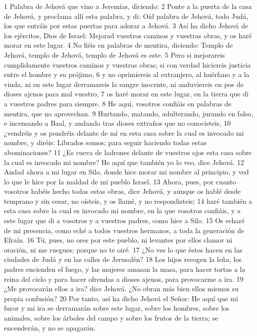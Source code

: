 1 Palabra de Jehová que vino a Jeremías, diciendo:
2 Ponte a la puerta de la casa de Jehová, y proclama allí esta palabra, y di: Oíd palabra de Jehová, todo Judá, los que entráis por estas puertas para adorar a Jehová.
3 Así ha dicho Jehová de los ejércitos, Dios de Israel: Mejorad vuestros caminos y vuestras obras, y os haré morar en este lugar.
4 No fiéis en palabras de mentira, diciendo: Templo de Jehová, templo de Jehová, templo de Jehová es este.
5 Pero si mejorareis cumplidamente vuestros caminos y vuestras obras; si con verdad hiciereis justicia entre el hombre y su prójimo,
6 y no oprimiereis al extranjero, al huérfano y a la viuda, ni en este lugar derramareis la sangre inocente, ni anduviereis en pos de dioses ajenos para mal vuestro,
7 os haré morar en este lugar, en la tierra que di a vuestros padres para siempre. 
8 He aquí, vosotros confiáis en palabras de mentira, que no aprovechan.
9 Hurtando, matando, adulterando, jurando en falso, e incensando a Baal, y andando tras dioses extraños que no conocisteis,
10 ¿vendréis y os pondréis delante de mí en esta casa sobre la cual es invocado mi nombre, y diréis: Librados somos; para seguir haciendo todas estas abominaciones?
11 ¿Es cueva de ladrones delante de vuestros ojos esta casa sobre la cual es invocado mi nombre? He aquí que también yo lo veo, dice Jehová.
12 Andad ahora a mi lugar en Silo, donde hice morar mi nombre al principio, y ved lo que le hice por la maldad de mi pueblo Israel.
13 Ahora, pues, por cuanto vosotros habéis hecho todas estas obras, dice Jehová, y aunque os hablé desde temprano y sin cesar, no oísteis, y os llamé, y no respondisteis;
14 haré también a esta casa sobre la cual es invocado mi nombre, en la que vosotros confiáis, y a este lugar que di a vosotros y a vuestros padres, como hice a Silo. 
15 Os echaré de mi presencia, como eché a todos vuestros hermanos, a toda la generación de Efraín.
16 Tú, pues, no ores por este pueblo, ni levantes por ellos clamor ni oración, ni me ruegues; porque no te oiré.
17 ¿No ves lo que éstos hacen en las ciudades de Judá y en las calles de Jerusalén?
18 Los hijos recogen la leña, los padres encienden el fuego, y las mujeres amasan la masa, para hacer tortas a la reina del cielo y para hacer ofrendas a dioses ajenos, para provocarme a ira.
19 ¿Me provocarán ellos a ira? dice Jehová. ¿No obran más bien ellos mismos su propia confusión?
20 Por tanto, así ha dicho Jehová el Señor: He aquí que mi furor y mi ira se derramarán sobre este lugar, sobre los hombres, sobre los animales, sobre los árboles del campo y sobre los frutos de la tierra; se encenderán, y no se apagarán.

